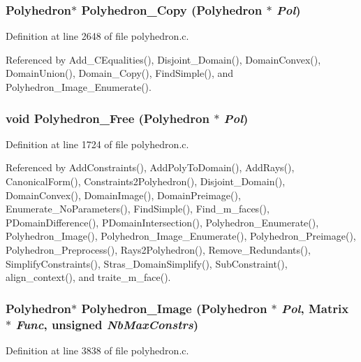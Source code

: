 \subsubsection{\setlength{\rightskip}{0pt plus 5cm}Polyhedron$\ast$ Polyhedron\_\-Copy (Polyhedron $\ast$ {\em Pol})}\label{polyhedron_8c_a36}




Definition at line 2648 of file polyhedron.c.

Referenced by Add\_\-CEqualities(), Disjoint\_\-Domain(), Domain\-Convex(), Domain\-Union(), Domain\_\-Copy(), Find\-Simple(), and Polyhedron\_\-Image\_\-Enumerate().

\subsubsection{\setlength{\rightskip}{0pt plus 5cm}void Polyhedron\_\-Free (Polyhedron $\ast$ {\em Pol})}\label{polyhedron_8c_a18}




Definition at line 1724 of file polyhedron.c.

Referenced by Add\-Constraints(), Add\-Poly\-To\-Domain(), Add\-Rays(), Canonical\-Form(), Constraints2Polyhedron(), Disjoint\_\-Domain(), Domain\-Convex(), Domain\-Image(), Domain\-Preimage(), Enumerate\_\-No\-Parameters(), Find\-Simple(), Find\_\-m\_\-faces(), PDomain\-Difference(), PDomain\-Intersection(), Polyhedron\_\-Enumerate(), Polyhedron\_\-Image(), Polyhedron\_\-Image\_\-Enumerate(), Polyhedron\_\-Preimage(), Polyhedron\_\-Preprocess(), Rays2Polyhedron(), Remove\_\-Redundants(), Simplify\-Constraints(), Stras\_\-Domain\-Simplify(), Sub\-Constraint(), align\_\-context(), and traite\_\-m\_\-face().

\subsubsection{\setlength{\rightskip}{0pt plus 5cm}Polyhedron$\ast$ Polyhedron\_\-Image (Polyhedron $\ast$ {\em Pol}, Matrix $\ast$ {\em Func}, unsigned {\em Nb\-Max\-Constrs})}\label{polyhedron_8c_a52}




Definition at line 3838 of file polyhedron.c.

